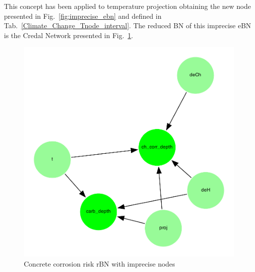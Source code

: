 This concept has been applied to temperature projection obtaining the new node presented in Fig.~\ref{fig:imprecise_ebn} and defined in Tab.~\ref{Climate_Change_Tnode_interval}. The reduced BN of this imprecise eBN is the Credal Network presented in Fig.~\ref{fig:imprecise_rbn}.

\begin{figure}[H]
    \centering
    \includegraphics[width=\linewidth]{imgs/pdfs/15_total_rbn_imprecise.pdf}
    \caption{Concrete corrosion risk rBN with imprecise nodes}\label{fig:imprecise_rbn}
\end{figure}